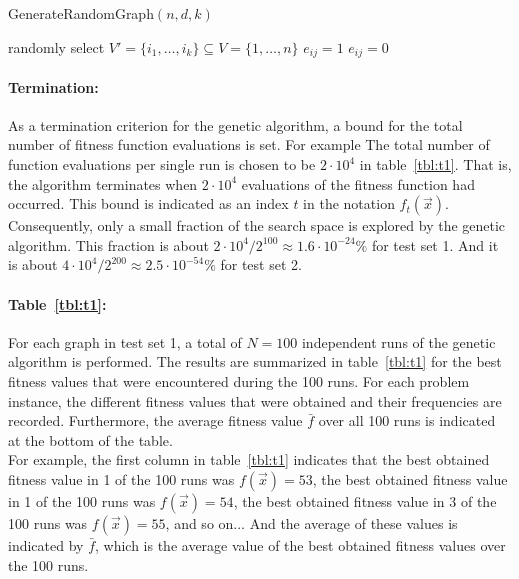 \documentclass[12pt]{article}
\begin{document}
\begin{algorithm}
\caption{GenerateRandomGraph$(n, d, k)$}
\label{alg:gen}
\begin{algorithmic}[1]


\State randomly select $V' = \{i_1, \dots, i_k\} \subseteq V = \{1, \dots, n\}$
\State
{}
\State $e_{ij} = 1$
\Else
\State $e_{ij} = 0$
\EndIf
\EndFor
\EndFor


\end{algorithmic}
\end{algorithm}

\paragraph{Termination:}
As a termination criterion for the genetic algorithm,
a bound for the total number of fitness function evaluations is set.
For example The total number of function evaluations per single run
is chosen to be $2 \cdot 10^4$ in table~\ref{tbl:t1}.
That is, the algorithm terminates when $2 \cdot 10^4$ evaluations of the fitness function
had occurred.
This bound is indicated as an index $t$ in the notation $f_t(\vec{x})$.
Consequently, only a small fraction of the search space is explored by the genetic algorithm.
This fraction is about
$ 2 \cdot 10^4 / 2^{100} \approx 1.6 \cdot 10^{-24} \% $
for test set 1.
And it is about $ 4 \cdot 10^4 / 2^{200} \approx 2.5 \cdot 10^{-54} \% $ for test set 2.

\paragraph{Table~\ref{tbl:t1}:}
For each graph in test set 1, a total of
$N = 100$ independent runs of the genetic algorithm is performed.
The results are summarized in table~\ref{tbl:t1} for the best
fitness values that were encountered during the 100 runs.
For each problem instance, the different fitness values that were
obtained and their frequencies are recorded.
Furthermore, the average fitness value $\bar{f}$ over
all 100 runs is indicated at the bottom of the table.\\
For example, the first column in table~\ref{tbl:t1} indicates
that the best obtained fitness value in 1 of the 100 runs was $f(\vec{x}) = 53$,
the best obtained fitness value in 1 of the 100 runs was $f(\vec{x}) = 54$,
the best obtained fitness value in 3 of the 100 runs was $f(\vec{x}) = 55$, and so on...
And the average of these values is indicated by $\bar{f}$, which is the average value of
the best obtained fitness values over the 100 runs.
\end{document}
